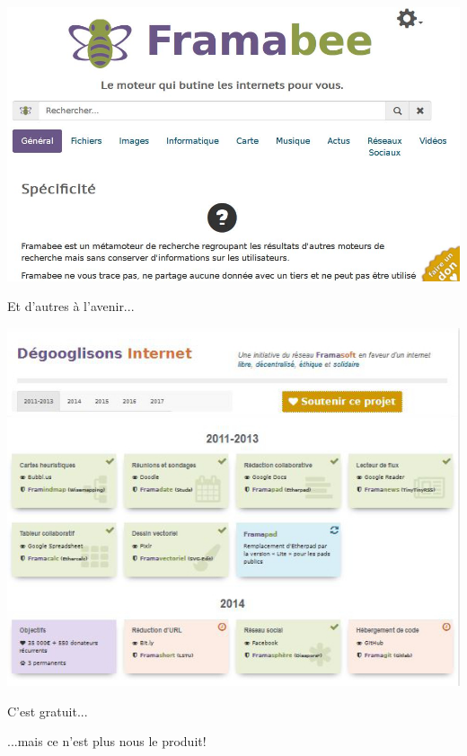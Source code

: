 \documentclass{beamer}
\begin{document}
\begin{frame}
\begin{center}
\includegraphics[scale=0.5]{./images/Framabee.jpg}
\end{center}
\end{frame}


\begin{frame}
\Huge{\centerline{Et d'autres à l'avenir...}}
\end{frame}

\begin{frame}
\begin{center}
\includegraphics[scale=0.5]{./images/Roadmap.jpg}
\end{center}
\end{frame}

\begin{frame}
\Huge{\centerline{C'est gratuit...}}
\Huge{\centerline{...mais ce n'est plus nous le produit!}}
\end{frame}
\end{document}
